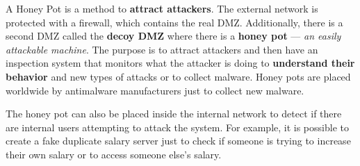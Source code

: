 A Honey Pot is a method to \textbf{attract attackers}. The external network is protected with a firewall, which contains the real DMZ. Additionally, there is a second DMZ called the \textbf{decoy DMZ} where there is a \textbf{honey pot} — \textit{an easily attackable machine}. The purpose is to attract attackers and then have an inspection system that monitors what the attacker is doing to \textbf{understand their behavior} and new types of attacks or to collect malware. Honey pots are placed worldwide by antimalware manufacturers just to collect new malware.


The honey pot can also be placed inside the internal network to detect if there are internal users attempting to attack the system. For example, it is possible to create a fake duplicate salary server just to check if someone is trying to increase their own salary or to access someone else’s salary.
